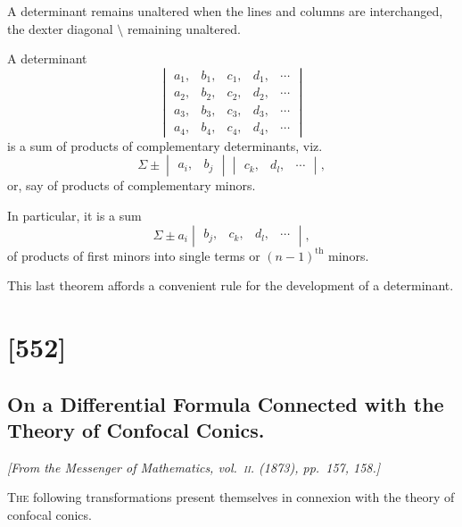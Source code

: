 \documentclass[11pt,a4paper]{book}
\begin{document}
A determinant remains unaltered when the lines and columns are interchanged, the
dexter diagonal $\setminus$ remaining unaltered.

\clearpage

A determinant
\[
\begin{vmatrix} a_1, & b_1, & c_1, & d_1, & \cdots \\ a_2, & b_2, & c_2, & d_2, & \cdots \\ a_3, & b_3, & c_3, & d_3, & \cdots \\ a_4, & b_4, & c_4, & d_4, & \cdots \end{vmatrix}
\]
is a sum of products of complementary determinants, viz.\
\[
\Sigma \pm \begin{vmatrix} a_i, & b_j \end{vmatrix}\begin{vmatrix} c_k, & d_l, & \cdots \end{vmatrix},
\]
or, say of products of complementary minors.

In particular, it is a sum
\[
\Sigma \pm a_i \begin{vmatrix} b_j, & c_k, & d_l, & \cdots \end{vmatrix},
\]
of products of first minors into single terms or $(n-1)^{\text{th}}$ minors.

This last theorem affords a convenient rule for the development of a determinant.

\clearpage

\section{[552]}
\subsection{On a Differential Formula Connected with the Theory of Confocal Conics.}

\begin{center}
\textit{[From the Messenger of Mathematics, vol.~\textsc{ii}. (1873), pp.~157, 158.]}
\end{center}

\textsc{The} following transformations present themselves in connexion with the theory of
confocal conics.
\end{document}
